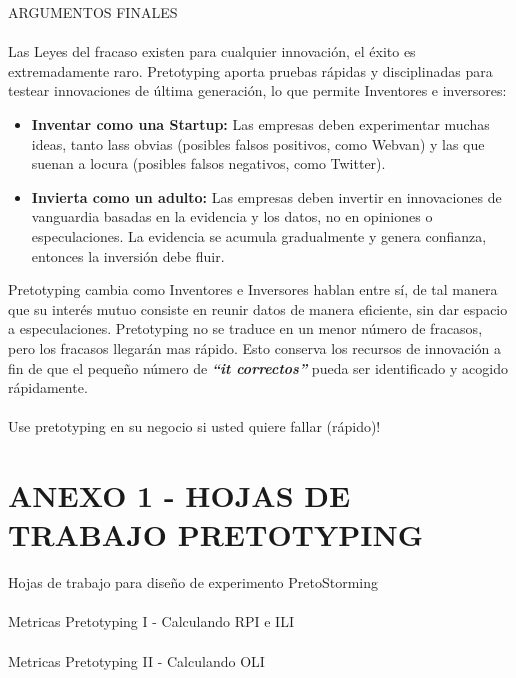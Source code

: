 \documentclass{article}
\begin{document}
ARGUMENTOS FINALES
\\ \\
Las Leyes del fracaso existen para cualquier innovaci\'on, el \'exito es extremadamente raro. Pretotyping aporta pruebas r\'apidas y disciplinadas para testear innovaciones de \'ultima generaci\'on, lo que permite Inventores e inversores:

\begin{itemize}

\item \textbf{Inventar como una Startup:} Las empresas deben experimentar muchas ideas, tanto lass obvias (posibles falsos positivos, como Webvan) y las que suenan a locura (posibles falsos negativos, como Twitter).

\item \textbf{Invierta como un adulto:} Las empresas deben invertir en innovaciones de vanguardia basadas en la evidencia y los datos, no en opiniones o especulaciones. La evidencia se acumula gradualmente y genera confianza, entonces la inversi\'on debe fluir.

\end{itemize}

Pretotyping cambia como Inventores e Inversores hablan entre s\'i, de tal manera que su inter\'es mutuo consiste en reunir datos de manera eficiente, sin dar espacio a especulaciones. Pretotyping no se traduce en un menor n\'umero de fracasos, pero los fracasos llegar\'an mas r\'apido. Esto conserva los recursos de innovaci\'on a fin de que el peque\~no n\'umero de \textbf{\textit{``it correctos''}} pueda ser identificado y acogido r\'apidamente.
\\ \\
Use pretotyping en su negocio si usted quiere fallar (r\'apido)!
\clearpage

\section{ANEXO 1 - HOJAS DE TRABAJO PRETOTYPING}

Hojas de trabajo para dise\~no de experimento PretoStorming
\\ \\
Metricas Pretotyping I - Calculando RPI e ILI
\\ \\
Metricas Pretotyping II - Calculando OLI
\clearpage
 
\end{document}
